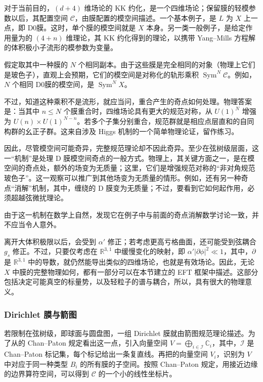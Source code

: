 对于当前目的，$(d+4)$ 维场论的 KK 约化，是一个四维场论；保留膜的轻模参数以后，其配置空间 $\mathcal{C}$，由膜配置的模空间描述。一个基本例子，是 $L$ 为 $X$ 上一点，即 D0膜。这时，单个膜的模空间就是 $X$ 本身。另一类一般例子，是给定作用量为的 $(4+n)$ 维理论，其 KK 约化得到的理论，以携带 Yang--Mills 方程解的体积极小子流形的模参数为变量。

假定取其中一种膜的 $N$ 个相同副本。由于这些膜是完全相同的对象（物理上它们是玻色子），直观上会预期，它们的模空间是对称化的轨形乘积 $\operatorname{Sym}^N\mathcal{C}$。例如，$N$ 个相同 D0膜的模空间，是 $\operatorname{Sym}^NX$。

不过，知道这种乘积不是流形，就应当问，重合产生的奇点如何处理。物理答案是：当其中 $n\le N$ 个膜重合时，四维场论具有更大的规范对称，从 $U(1)^N$ 增强为 $U(n)\times U(1)^{N-n}$。若多个子集分别重合，规范群就是相应点层直和的自同构群的幺正子群。这来自涉及 Higgs 机制的一个简单物理论证，留作练习。

因此，尽管模空间可能奇异，完整规范理论却不因此奇异。至少在弦树级层面，这一“机制”是处理 D 膜模空间奇点的一般方式。物理上，其关键方面之一，是在模空间的奇点处，额外的场变为无质量；这里，它们是增强规范对称的“非对角规范玻色子”。这一观察可以推广到其他场变为无质量的情形。例如，还有另一种奇点“消解”机制，其中，缠绕的 D 膜变为无质量；不过，要看到它如何起作用，必须超越弦微扰理论。

由于这一机制在数学上自然，发现它在例子中与前面的奇点消解数学讨论一致，并不应当令人意外。

离开大体积极限以后，会受到 $\alpha'$ 修正；若考虑更高亏格曲面，还可能受到弦耦合 $g_s$ 修正。不过，只要仅考虑在 $\mathbb{R}^{3,1}$ 中缓慢变化的映射，即 $\alpha'|\partial\phi|^2\ll1$，其中，$\partial$ 是 $\mathbb{R}^{3,1}$ 中的导数，就仍然能导出类似的四维场论，也就是有效场论。因此，无论 $X$ 中膜的完整物理如何，都有一部分可以在本节建立的 EFT 框架中描述。这部分包括决定可能真空的标量势，以及轻粒子的谱与耦合，所以，具有很大的物理意义。

\subsubsection{Dirichlet 膜与箭图}\label{sec:5.4.2.1}

若限制在弦树级，即球面与圆盘图，一组 Dirichlet 膜就由箭图规范理论描述。为了从的 Chan--Paton 规定看出这一点，引入向量空间 $V=\bigoplus_{i\in\mathcal{I}}\mathbb{C}_i$，其中，$\mathcal{I}$ 是 Chan--Paton 标记集，每个标记给出一条复直线。再把的向量空间 $V_i$，识别为 $V$ 中对应于同一种类型 $B_i$ 的所有膜的子空间。按照 Chan--Paton 规定，用接近边缘的边界算符空间，可以得到 $\mathcal{C}$ 的一个小的线性坐标片。

